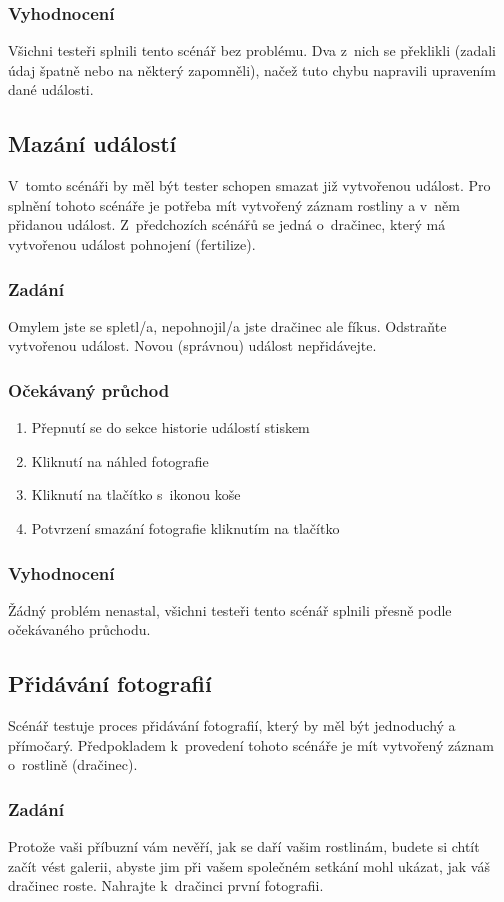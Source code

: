 \documentclass[thesis=M,czech]{FITthesis}[2019/12/23]
\begin{document}
\subsubsection*{Vyhodnocení}
Všichni testeři splnili tento scénář bez problému. Dva z~nich se překlikli (zadali údaj špatně nebo na některý zapomněli), načež tuto chybu napravili upravením dané události.

\subsection{Mazání událostí}
V~tomto scénáři by měl být tester schopen smazat již vytvořenou událost. Pro splnění tohoto scénáře je potřeba mít vytvořený záznam rostliny a v~něm přidanou událost. Z~předchozích scénářů se jedná o~dračinec, který má vytvořenou událost pohnojení (fertilize).
\subsubsection*{Zadání}
Omylem jste se spletl/a, nepohnojil/a jste dračinec ale fíkus. Odstraňte vytvořenou událost. Novou (správnou) událost nepřidávejte.
\subsubsection*{Očekávaný průchod}
\begin{enumerate}
    \item Přepnutí se do sekce historie událostí stiskem 
    \item Kliknutí na náhled fotografie
    \item Kliknutí na tlačítko s~ikonou koše
    \item Potvrzení smazání fotografie kliknutím na tlačítko 
\end{enumerate}
\subsubsection*{Vyhodnocení}
Žádný problém nenastal, všichni testeři tento scénář splnili přesně podle očekávaného průchodu.

\subsection{Přidávání fotografií}
Scénář testuje proces přidávání fotografií, který by měl být jednoduchý a přímočarý. Předpokladem k~provedení tohoto scénáře je mít vytvořený záznam o~rostlině (dračinec).
\subsubsection*{Zadání}
Protože vaši příbuzní vám nevěří, jak se daří vašim rostlinám, budete si chtít začít vést galerii, abyste jim při vašem společném setkání mohl ukázat, jak váš dračinec roste. Nahrajte k~dračinci první fotografii.
\end{document}
